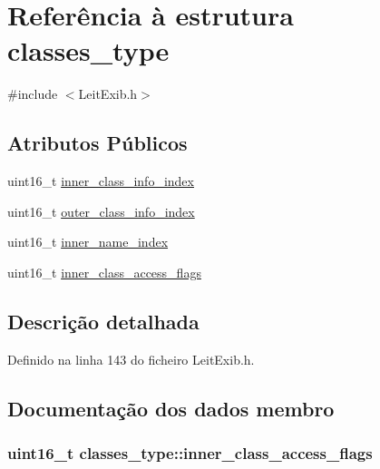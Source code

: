 \hypertarget{structclasses__type}{\section{Referência à estrutura classes\-\_\-type}
\label{structclasses__type}
}


{\ttfamily \#include $<$Leit\-Exib.\-h$>$}

\subsection*{Atributos Públicos}
\begin{DoxyCompactItemize}
\item 
uint16\-\_\-t \hyperlink{structclasses__type_a8ee3c154b6031adfa97fccc80d7a76ff}{inner\-\_\-class\-\_\-info\-\_\-index}
\item 
uint16\-\_\-t \hyperlink{structclasses__type_a8a32528b616cd9d1cfc3278e8c942f8f}{outer\-\_\-class\-\_\-info\-\_\-index}
\item 
uint16\-\_\-t \hyperlink{structclasses__type_acd3c408b30a72b1ae22a56fb8642684c}{inner\-\_\-name\-\_\-index}
\item 
uint16\-\_\-t \hyperlink{structclasses__type_a6e2e0b5e77749572a331f070924620ad}{inner\-\_\-class\-\_\-access\-\_\-flags}
\end{DoxyCompactItemize}


\subsection{Descrição detalhada}


Definido na linha 143 do ficheiro Leit\-Exib.\-h.



\subsection{Documentação dos dados membro}
\hypertarget{structclasses__type_a6e2e0b5e77749572a331f070924620ad}{
\subsubsection[{inner\-\_\-class\-\_\-access\-\_\-flags}]{\setlength{\rightskip}{0pt plus 5cm}uint16\-\_\-t classes\-\_\-type\-::inner\-\_\-class\-\_\-access\-\_\-flags}}\label{structclasses__type_a6e2e0b5e77749572a331f070924620ad}


